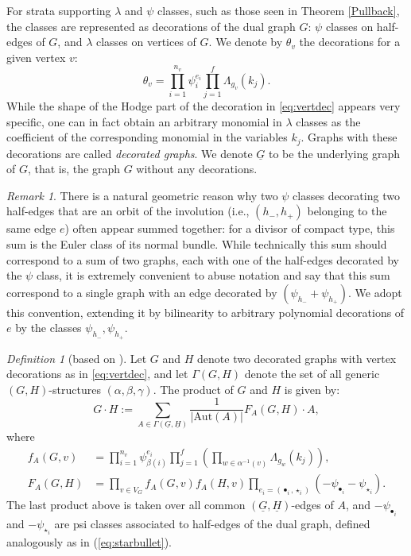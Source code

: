 \documentclass[leqno,12pt]{amsart}
\theoremstyle{remark}
\newtheorem{remark}[theorem]{Remark}
\newtheorem{definition}[theorem]{Definition}
\numberwithin{equation}{section}
\newcommand{\renzo}{}
\begin{document}

For strata supporting $\lambda$ and $\psi$ classes, such as those seen in Theorem \ref{Pullback}, the classes are represented as decorations of the dual graph $G$: $\psi$ classes on half-edges of $G$, and $\lambda$ classes on vertices of $G$.
We denote by $\theta_v$ the decorations for a given vertex $v$: \begin{equation}\label{eq:vertdec}
  \theta_v = \prod_{i=1}^{n_v}\psi_i^{e_i}\prod_{j=1}^{f}\Lambda_{g_v}(k_j).  
\end{equation} 
While the shape of the Hodge part of the decoration in \eqref{eq:vertdec} appears very specific, one can in fact obtain an arbitrary monomial in $\lambda$ classes as the coefficient of the corresponding monomial in the variables $k_j$. Graphs with these decorations are called \emph{decorated graphs}. We denote $\underline{G}$ to be the underlying graph of $G$, that is, the graph $G$ without any decorations.

\begin{remark}
There is a natural geometric reason why two $\psi$ classes decorating two half-edges that are an orbit of the involution (i.e., $(h_-,h_+)$ belonging to the same edge $e$) often appear summed together: for a divisor of compact type, this sum is the Euler class of its normal bundle. While technically this sum should correspond to a sum of two graphs, each with one of the half-edges decorated by the $\psi$ class, it is extremely convenient to abuse notation and say that this sum correspond to a single graph with an edge decorated by $(\psi_{h_-} + \psi_{h_+})$. We adopt this convention, extending it by bilinearity to arbitrary polynomial decorations of $e$ by the classes $\psi_{h_-}, \psi_{h_+}$.   
\end{remark}



\begin{definition}[based on \cite{graberpandharipande, Yang}]\label{Yang} Let $G$ and $H$ denote two decorated graphs with vertex decorations as in \eqref{eq:vertdec}, and let $\Gamma(G, H)$ denote the set of all generic $(G, H)$-structures $(\alpha, \beta, \gamma)$. The product of  $G$ and $H$ is given by:
$$
G \cdot H := \sum_{A\in\Gamma(\underline{G}, \underline{H})} \frac{1}{|\text{Aut}(A)|}F_A(G, H)\cdot A,
$$
where 
\begin{align*}
    f_A(G, v) &= \prod_{i=1}^{n_v}\psi_{\beta(i)}^{e_i}\prod_{j=1}^{f}\left(\prod_{w \in \alpha^{-1}(v)}\Lambda_{g_w}(k_j)\right),\\
    F_A(G, H) &= \prod_{v \in V_G} f_A(G, v) f_A(H, v) \prod_{e_i = (\bullet_i, \star_i)} (-\psi_{\bullet_i} - \psi_{\star_i}).
\end{align*}
The last product above is taken over all common $(\underline{G},\underline{H})$-edges of $A$, and $-\psi_{\bullet_i}$ and $- \psi_{\star_i}$ are psi classes associated to half-edges of the dual graph, defined analogously as in (\ref{eq:starbullet}).
\end{definition} 
\end{document}
